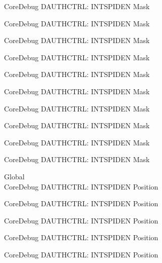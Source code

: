 \begin{DoxyRefList}
\label{deprecated__deprecated000541}%
%
Core\+Debug DAUTHCTRL\+: INTSPIDEN Mask 

\label{deprecated__deprecated000643}%
%
Core\+Debug DAUTHCTRL\+: INTSPIDEN Mask 

\label{deprecated__deprecated000768}%
%
Core\+Debug DAUTHCTRL\+: INTSPIDEN Mask 

\label{deprecated__deprecated000822}%
%
Core\+Debug DAUTHCTRL\+: INTSPIDEN Mask 

\label{deprecated__deprecated000898}%
%
Core\+Debug DAUTHCTRL\+: INTSPIDEN Mask 

\label{deprecated__deprecated000961}%
%
Core\+Debug DAUTHCTRL\+: INTSPIDEN Mask 

\label{deprecated__deprecated001040}%
%
Core\+Debug DAUTHCTRL\+: INTSPIDEN Mask 

\label{deprecated__deprecated001116}%
%
Core\+Debug DAUTHCTRL\+: INTSPIDEN Mask 

\label{deprecated__deprecated001219}%
%
Core\+Debug DAUTHCTRL\+: INTSPIDEN Mask 

\label{deprecated__deprecated001321}%
%
Core\+Debug DAUTHCTRL\+: INTSPIDEN Mask  
\item[Global \doxylink{group___c_m_s_i_s___s_c_b_ga3caef9790e4e2ccbfea77d55315ad59f}{Core\+Debug\+\_\+\+DAUTHCTRL\+\_\+\+INTSPIDEN\+\_\+\+Pos} ]\hfill \\
\label{deprecated__deprecated000089}%
%
Core\+Debug DAUTHCTRL\+: INTSPIDEN Position 

\label{deprecated__deprecated000143}%
%
Core\+Debug DAUTHCTRL\+: INTSPIDEN Position 

\label{deprecated__deprecated000219}%
%
Core\+Debug DAUTHCTRL\+: INTSPIDEN Position 

\label{deprecated__deprecated000282}%
%
Core\+Debug DAUTHCTRL\+: INTSPIDEN Position 

\label{deprecated__deprecated000361}%
%
Core\+Debug DAUTHCTRL\+: INTSPIDEN Position 


\end{DoxyRefList}
